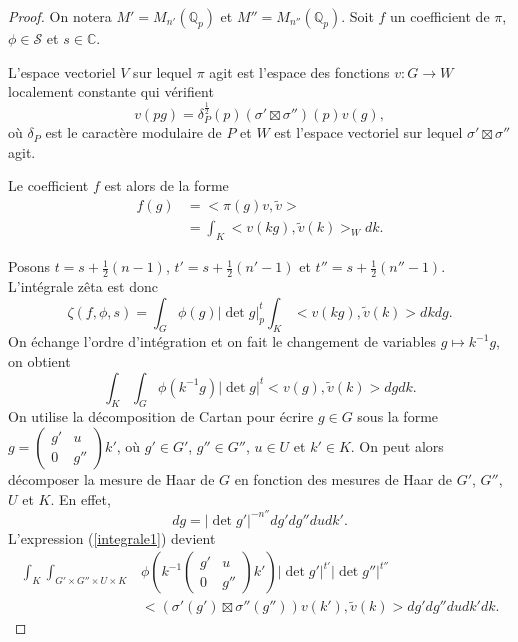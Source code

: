 \begin{proof}
On notera $M'=M_{n'}(\mathbb{Q}_p)$ et $M''=M_{n''}(\mathbb{Q}_p)$. Soit $f$ un coefficient de $\pi$, $\phi \in \mathcal{S}$ et $s \in \mathbb{C}$.

L'espace vectoriel $V$ sur lequel $\pi$ agit est l'espace des fonctions $v : G \rightarrow W$ localement constante qui vérifient
\begin{equation}
v(pg)=\delta_P^{\frac{1}{2}}(p)(\sigma' \boxtimes \sigma'')(p)v(g),
\end{equation}
où $\delta_P$ est le caractère modulaire de $P$ et $W$ est l'espace vectoriel sur lequel $\sigma' \boxtimes \sigma''$ agit.

Le coefficient $f$ est alors de la forme
\begin{align}
f(g)&=<\pi(g)v,\tilde{v}> \\
&= \int_K <v(kg),\tilde{v}(k)>_W dk.
\end{align}

Posons $t=s+\frac{1}{2}(n-1)$, $t'=s+\frac{1}{2}(n'-1)$ et $t''=s+\frac{1}{2}(n''-1)$. L'intégrale zêta est donc
\begin{equation}
\zeta(f,\phi,s)=\int_G \phi(g)|\det g|_p^t \int_K <v(kg),\tilde{v}(k)>dk dg.
\end{equation}
On échange l'ordre d'intégration et on fait le changement de variables $g \mapsto k^{-1}g$, on obtient
\begin{equation}
\label{integrale1}
\int_K \int_G \phi(k^{-1}g)|\det g|^t<v(g),\tilde{v}(k)>dg dk.
\end{equation}
On utilise la décomposition de Cartan pour écrire $g \in G$ sous la forme $g = \begin{pmatrix} 
g' & u \\
0 & g'' 
\end{pmatrix} k'$, où $g' \in G'$, $g'' \in G''$, $u \in U$ et $k' \in K$. On peut alors décomposer la mesure de Haar de $G$ en fonction des mesures de Haar de $G'$, $G''$, $U$ et $K$. En effet,
\begin{equation}
dg = |\det g'|^{-n''}dg'dg''dudk'.
\end{equation}
L'expression (\ref{integrale1}) devient
\begin{equation}
\label{integrale2}
\begin{split}
\int_K \int_{G' \times G'' \times U \times K} &\phi(k^{-1}\begin{pmatrix} 
g' & u \\
0 & g'' 
\end{pmatrix} k') |\det g'|^{t'}|\det g''|^{t''} \\
&<(\sigma'(g') \boxtimes \sigma''(g''))v(k'), \tilde{v}(k)> dg' dg'' du dk' dk.
\end{split}
\end{equation}


\end{proof}
